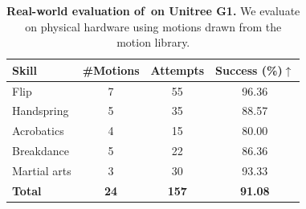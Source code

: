 \begin{table}[t]
\vspace{-1mm}
\centering
\small
\setlength{\tabcolsep}{4pt}
\renewcommand{\arraystretch}{1.05}
\caption{\small \textbf{Real-world evaluation of~\model on Unitree G1.}
We evaluate \model on physical hardware using motions drawn from
the \dataset motion library.}
\label{tab:hw_overall}

\begin{tabular}{l|c c c}
\hline
Skill 
& \#Motions 
& Attempts 
& Success (\%)$\uparrow$ \\
\hline
Flip 
& 7 & 55 & 96.36 \\

Handspring 
& 5 & 35 & 88.57 \\

Acrobatics 
& 4 & 15 & 80.00 \\

Breakdance 
& 5 & 22 & 86.36 \\

Martial arts 
& 3 & 30 & 93.33 \\

\hline
\textbf{Total}
& \textbf{24}
& \textbf{157}
& \textbf{91.08} \\
\hline
\end{tabular}

\vspace{-1mm}
\end{table}
